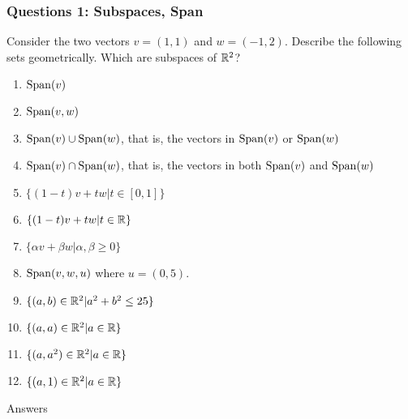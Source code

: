 \documentclass{beamer}
\begin{document}
\begin{frame}
	\frametitle{Questions 1: Subspaces, Span}
	Consider the two vectors $v=(1,1)$ and
	$w=(-1,2)$.  Describe the following sets geometrically.  Which are
	subspaces of $\mathbb{R}^2$?
	\begin{enumerate}
		\item ${{\rm Span}}(v)$
		\item ${{\rm Span}}(v,w)$
		\item ${{\rm Span}}(v)\cup{{\rm Span}}(w)$, that is, the vectors in ${{\rm Span}}(v)$ or
			${{\rm Span}}(w)$
		\item ${{\rm Span}}(v)\cap{{\rm Span}}(w)$, that is, the vectors in both ${{\rm Span}}(v)$ and
			${{\rm Span}}(w)$
			\pause
		\item $\{(1-t)v + tw | t\in[0,1]\}$
		\item $\{(1-t)v+tw | t\in\mathbb{R}\}$
		\item $\{\alpha v + \beta w | \alpha,\beta\geq 0\}$
		\item ${{\rm Span}}(v,w,u)$ where $u=(0,5)$.
		\item $\{(a,b)\in\mathbb{R}^2 | a^2+b^2\leq 25\}$
		\item $\{(a,a)\in\mathbb{R}^2 | a\in\mathbb{R}\}$
		\item $\{(a,a^2)\in\mathbb{R}^2 | a\in\mathbb{R}\}$
		\item $\{(a,1)\in\mathbb{R}^2 | a\in\mathbb{R}\}$
	\end{enumerate}
\end{frame}

\begin{frame}[t]{Answers}
	\grid
	\pause
	\pause
\end{frame}


\end{document}
